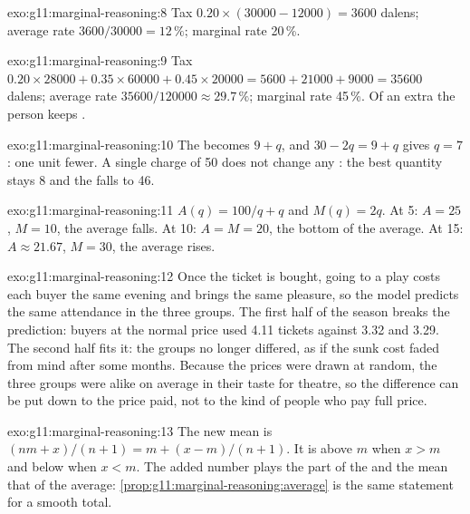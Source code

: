 \begin{solution}{exo:g11:marginal-reasoning:8}
Tax $0.20 \times (30000 - 12000) = 3600$ dalens; average rate $3600/30000 = 12\,\%$; marginal rate 20\,\%.
\end{solution}

\begin{solution}{exo:g11:marginal-reasoning:9}
Tax $0.20 \times 28000 + 0.35 \times 60000 + 0.45 \times 20000 = 5600 + 21000 + 9000 = 35600$ dalens; average rate $35600/120000 \approx 29.7\,\%$; marginal rate 45\,\%.
Of an extra  the person keeps .
\end{solution}

\begin{solution}{exo:g11:marginal-reasoning:10}
The  becomes $9 + q$, and $30 - 2q = 9 + q$ gives $q = 7$: one unit fewer. A single charge of 50 does not change any : the best
quantity stays 8 and the  falls to 46.
\end{solution}

\begin{solution}{exo:g11:marginal-reasoning:11}
$A(q) = 100/q + q$ and $M(q) = 2q$. At 5: $A = 25$, $M = 10$, the average falls. At 10: $A = M = 20$, the bottom of the average. At 15: $A \approx 21.67$, $M = 30$,
the average rises.
\end{solution}

\begin{solution}{exo:g11:marginal-reasoning:12}
Once the ticket is bought, going to a play costs each buyer the same evening and brings the same pleasure, so the model predicts the same attendance in the three
groups. The first half of the season breaks the prediction: buyers at the normal price used 4.11 tickets against 3.32 and 3.29. The second half fits it: the groups
no longer differed, as if the sunk cost faded from mind after some months. Because the prices were drawn at random, the three groups were alike on average in
their taste for theatre, so the difference can be put down to the price paid, not to the kind of people who pay full price.
\end{solution}

\begin{solution}{exo:g11:marginal-reasoning:13}
The new mean is $(nm + x)/(n + 1) = m + (x - m)/(n + 1)$. It is above $m$ when $x > m$ and below when $x < m$. The added number plays the part of the  and the mean that of the average: \cref{prop:g11:marginal-reasoning:average} is the same statement for a smooth total.
\end{solution}

